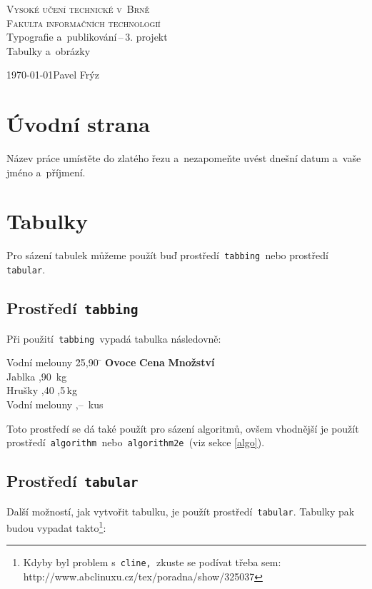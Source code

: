 \documentclass[11pt,a4paper]{article}
\begin{document}
\begin{titlepage}
  \begin{center}
    \Huge \textsc{Vysoké učení technické v~Brně \\
    \huge Fakulta informačních technologií\\
    }
    \LARGE Typografie a~publikování\,--\,3. projekt\\
    \Huge Tabulky a~obrázky\\
  \end{center}
  \Large \today \hfill Pavel Frýz
\end{titlepage}

\section{Úvodní strana}
  Název práce umístěte do zlatého řezu a~nezapomeňte uvést dnešní datum a~vaše jméno
  a~příjmení.

\section{Tabulky}
  Pro sázení tabulek můžeme použít buď prostředí\texttt{ tabbing }nebo prostředí\texttt{
  tabular}.

\subsection{Prostředí\texttt{ tabbing}}
  Při použití\texttt{ tabbing }vypadá tabulka následovně:
  \begin{tabbing}
    Vodní melouny \quad \= 25,90 \quad \=                \kill
    \textbf{Ovoce} \> \textbf{Cena} \> \textbf{Množství} \\
    Jablka         ,90         \,kg             \\
    Hrušky         ,40         ,5\,kg           \\
    Vodní melouny  ,--         \,kus            \\
  \end{tabbing}
  Toto prostředí se dá také použít pro sázení algoritmů, ovšem vhodnější je použít
  prostředí\texttt{ algorithm }nebo\texttt{ algorithm2e }(viz sekce \ref{algo}).

\subsection{Prostředí\texttt{ tabular}}
  Další možností, jak vytvořit tabulku, je použít prostředí\texttt{ tabular}. Tabulky pak
  budou vypadat takto\footnote{Kdyby byl problem s\texttt{~cline, }zkuste se podívat třeba
  sem: http://www.abclinuxu.cz/tex/poradna/show/325037}:
\end{document}
